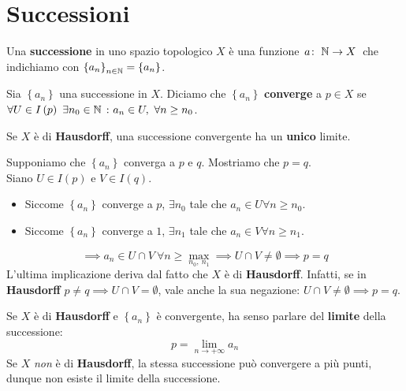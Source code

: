 \section{Successioni}
\begin{define}
Una \textbf{successione} in uno spazio topologico $X$ è una funzione $\funz{a}{\naturalset}{X}$ che indichiamo con $\left\{a_n\right\}_{n\in\mathbb{N}}=\left\{a_n\right\}$.
\end{define}
\begin{define}
Sia $\left\{a_n\right\}$ una successione in $X$. Diciamo che $\left\{a_n\right\}$ \textbf{converge} a $p\in X$ se $\forall U\in I\left(p\right)\ \exists n_0\in \mathbb{N}\ \colon a_n\in U,\ \forall n\geq n_0$.
\end{define}
\begin{observe}
	Se $X$ è di \textbf{Hausdorff}, una successione convergente ha un \textbf{unico} limite.
\end{observe}
\begin{demonstration}
	Supponiamo che $\left\{a_n\right\}$ converga a $p$ e $q$. Mostriamo che $p=q$.\\
	Siano $U\in I\left(p\right)$ e $V\in I\left(q\right)$.
	\begin{itemize}
		\item Siccome $\left\{a_n\right\}$ converge a $p$, $\exists n_0$ tale che $a_n\in U \forall n\geq n_0$.
		\item Siccome $\left\{a_n\right\}$ converge a $1$, $\exists n_1$ tale che $a_n\in V \forall n\geq n_1$.
	\end{itemize}
\begin{equation*}
\implies a_n\in U\cap V\ \forall n\geq \max_{n_0,\ n_1}\implies U\cap V\neq \emptyset\implies p=q
\end{equation*}
L'ultima implicazione deriva dal fatto che $X$ è di \textbf{Hausdorff}. Infatti, se in \textbf{Hausdorff} $p\neq q\implies U\cap V = \emptyset$, vale anche la sua negazione: $U\cap V\neq \emptyset\implies p = q$.
\end{demonstration}
\begin{define}
Se $X$ è di \textbf{Hausdorff} e $\left\{a_n\right\}$ è convergente, ha senso parlare del \textbf{limite} della successione:
\begin{equation}
p=\lim_{n \to +\infty}a_n
\end{equation}
Se $X$ \textit{non} è di \textbf{Hausdorff}, la stessa successione può convergere a più punti, dunque non esiste il limite della successione.
\end{define}
